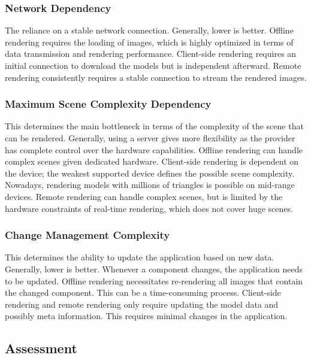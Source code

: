 \subsubsection{Network Dependency}

The reliance on a stable network connection. Generally, lower is better. Offline rendering requires the loading of images, which is highly optimized in terms of data transmission and rendering performance. Client-side rendering requires an initial connection to download the models but is independent afterward. Remote rendering consistently requires a stable connection to stream the rendered images.

\subsubsection{Maximum Scene Complexity Dependency}

This determines the main bottleneck in terms of the complexity of the scene that can be rendered. Generally, using a server gives more flexibility as the provider has complete control over the hardware capabilities. Offline rendering can handle complex scenes given dedicated hardware. Client-side rendering is dependent on the device; the weakest supported device defines the possible scene complexity. Nowadays, rendering models with millions of triangles is possible on mid-range devices. Remote rendering can handle complex scenes, but is limited by the hardware constraints of real-time rendering, which does not cover huge scenes.

\subsubsection{Change Management Complexity}

This determines the ability to update the application based on new data. Generally, lower is better. Whenever a component changes, the application needs to be updated. Offline rendering necessitates re-rendering all images that contain the changed component. This can be a time-consuming process. Client-side rendering and remote rendering only require updating the model data and possibly meta information. This requires minimal changes in the application.

\subsection*{Assessment}
\label{ch:paradigmAssessment}

